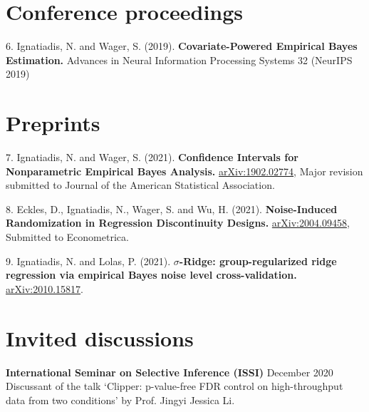 \documentclass[margin,line]{res}
\newenvironment{list1}{
  \begin{list}{\ding{113}}{%
      \setlength{\itemsep}{0in}
      \setlength{\parsep}{0in} \setlength{\parskip}{0in}
      \setlength{\topsep}{0in} \setlength{\partopsep}{0in}
      \setlength{\leftmargin}{0.17in}}}{\end{list}}
\begin{document}
\begin{resume}
\section{\sc Conference proceedings}
\begin{list1}
\item[6.] Ignatiadis, N. and Wager, S. (2019). \textbf{Covariate-Powered Empirical Bayes Estimation.} Advances in Neural Information Processing Systems 32 (NeurIPS 2019)
\end{list1}
\section{\sc Preprints}
\begin{list1}
\item[7.] Ignatiadis, N. and Wager, S. (2021). \textbf{Confidence Intervals for Nonparametric Empirical Bayes Analysis.} \href{https://arxiv.org/abs/1902.02774}{arXiv:1902.02774}, Major revision submitted to Journal of the American Statistical Association.
\item[8.] Eckles, D., Ignatiadis, N., Wager, S. and Wu, H. (2021). \textbf{Noise-Induced Randomization in Regression Discontinuity Designs.} \href{https://arxiv.org/abs/2004.09458}{arXiv:2004.09458}, Submitted to Econometrica.
\item[9.] Ignatiadis, N. and Lolas, P.  (2021). \textbf{$\sigma$-Ridge: group-regularized ridge regression via empirical Bayes noise level cross-validation.} \href{https://arxiv.org/abs/2010.15817}{arXiv:2010.15817}.
\end{list1}


\section{\sc Invited discussions}
\textbf{International Seminar on Selective Inference (ISSI)} \hfill December 2020\\
Discussant of the talk `Clipper: p-value-free FDR control on high-throughput data from two conditions' 
by Prof. Jingyi Jessica Li.


\end{resume}
\end{document}
